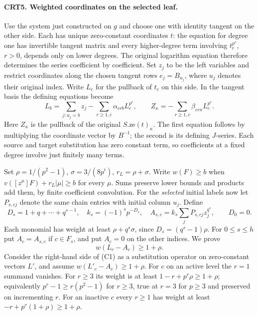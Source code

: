 \paragraph{CRT5. Weighted coordinates on the selected leaf.}
Use the system just constructed on $g$ and choose one with identity
tangent on the other side. Each has unique zero-constant coordinates
$t$: the equation for degree one has invertible tangent matrix and
every higher-degree term involving $t_c^{p^r}$, $r>0$, depends
only on lower degrees. The original logarithm equation therefore
determines the series coefficient by coefficient. Set $z_j$ to be
the left variables and restrict coordinates along the chosen tangent
rows $e_j=B_{u_j}$, where $u_j$ denotes their original index.
Write $L_c$ for the pullback of $t_c$ on this side. In the tangent
basis the defining equations become
\[
 L_b=\sum_{j:u_j=b}z_j-\sum_{r\ge1,c}\alpha_{crb}L_c^{p^r},
 \qquad Z_\kappa=-\sum_{r\ge1,c}\beta_{cr\kappa}L_c^{p^r}.
 \tag{C1}
\]
Here $Z_\kappa$ is the pullback of the original $S.\mathrm{ze}(t)_\kappa$.
The first equation follows by multiplying the coordinate vector by
$B^{-1}$; the second is its defining $J$-series. Each source and
target substitution has zero constant term, so coefficients at a fixed
degree involve just finitely many terms.

Set $\rho=1/(p^2-1)$, $\sigma=3/(8p^i)$, $r_L=\rho+\sigma$.
Write $w(F)\ge b$ when $v([z^\mu]F)+r_L|\mu|\ge b$ for every
$\mu$. Sums preserve lower bounds and products add them, by finite
coefficient convolution. For the \emph{selected} initial labels
now let $P_{s,cj}$ denote the same chain entries with initial column
$u_j$. Define
\[
 D_s=1+q+\cdots+q^{s-1},\quad
 k_s=(-1)^sp^{-D_s},\quad
 A_{s,c}=k_s\sum_j P_{s,cj}z_j^{q^s},\qquad D_0=0.
\]
Each monomial has weight at least $\rho+q^s\sigma$, since
$D_s=(q^s-1)\rho$. For $0\le s\le h$ put $A_c=A_{s,c}$ if
$c\in F_s$, and put $A_c=0$ on the other indices. We prove
\[
                         w(L_c-A_c)\ge1+\rho.             \tag{C2}
\]
Consider the right-hand side of (C1) as a substitution operator on
zero-constant vectors $L'$, and assume $w(L'_c-A_c)\ge1+\rho$.
For $c$ on an active level the $r=1$ summand vanishes. For $r\ge3$
its weight is at least $1-r+p^r\rho\ge1+\rho$; equivalently
$p^r-1\ge r(p^2-1)$ for $r\ge3$, true at $r=3$ for $p\ge3$ and
preserved on incrementing $r$. For an inactive $c$ every $r\ge1$
has weight at least $-r+p^r(1+\rho)\ge1+\rho$.

